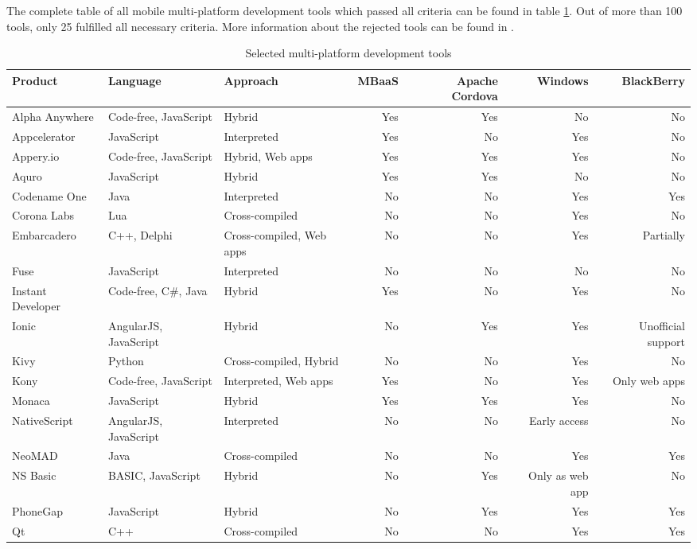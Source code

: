 \documentclass[english,master,public,dept460,male,cpdeclaration,oneside]{diploma}
\begin{document}
The complete table of all mobile multi-platform development tools which passed all criteria can be found in table \ref{table:frameworks}. Out of more than 100 tools, only 25 fulfilled all necessary criteria. More information about the rejected tools can be found in \cite{aarhus}. 

\begin{table}
	\centering
	\caption{Selected multi-platform development tools}
	\label{table:frameworks}
	\begin{tabular}{l l l r r r r}
		\toprule
		Product & Language & Approach & MBaaS & Apache Cordova & Windows & BlackBerry \\
		\midrule
		Alpha Anywhere & Code-free, JavaScript & Hybrid & Yes & Yes & No & No \\
		Appcelerator & JavaScript & Interpreted & Yes & No & Yes & No \\
		Appery.io & Code-free, JavaScript & Hybrid, Web apps & Yes & Yes & Yes & No \\
		Aquro & JavaScript & Hybrid & Yes & Yes & No & No \\
		Codename One & Java & Interpreted & No & No & Yes & Yes \\
		Corona Labs & Lua & Cross-compiled & No & No & Yes & No \\
		Embarcadero & C++, Delphi & Cross-compiled, Web apps & No & No & Yes & Partially \\
		Fuse & JavaScript & Interpreted & No & No & No & No \\
		Instant Developer & Code-free, C\#, Java & Hybrid & Yes & No & Yes & No \\
		Ionic & AngularJS, JavaScript & Hybrid & No & Yes & Yes & Unofficial support \\
		Kivy & Python & Cross-compiled, Hybrid & No & No & Yes & No \\
		Kony & Code-free, JavaScript & Interpreted, Web apps & Yes & No & Yes & Only web apps \\
		Monaca & JavaScript & Hybrid & Yes & Yes & Yes & No \\
		NativeScript & AngularJS, JavaScript & Interpreted & No & No & Early access & No \\
		NeoMAD & Java & Cross-compiled & No & No & Yes & Yes \\
		NS Basic & BASIC, JavaScript & Hybrid & No & Yes & Only as web app & No \\
		PhoneGap & JavaScript & Hybrid & No & Yes & Yes & Yes \\
		Qt & C++ & Cross-compiled & No & No & Yes & Yes \\

\end{tabular}
\end{table}
\end{document}
